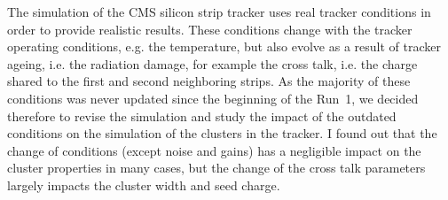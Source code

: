    
 

 







The simulation of the CMS silicon strip tracker uses real tracker conditions in order to provide realistic results. These conditions change with the tracker operating conditions, e.g. the temperature, but also evolve as a result of tracker ageing, i.e. the radiation damage, for example the cross talk, i.e. the charge shared to the first and second neighboring strips. As the majority of these conditions was never updated since the beginning of the Run~1, we decided therefore to revise the simulation and study the impact of the outdated conditions on the simulation of the clusters in the tracker. I found out that the change of conditions (except noise and gains) has a negligible impact on the cluster properties in many cases, but the change of the cross talk parameters largely impacts the cluster width and seed charge.

